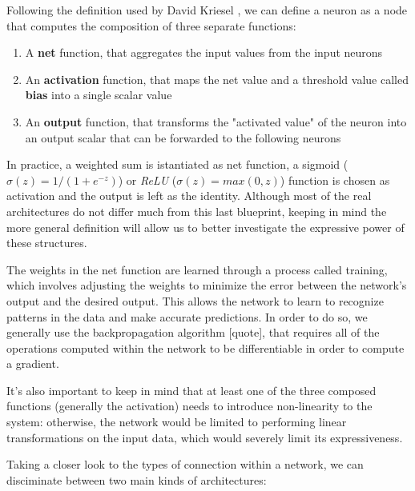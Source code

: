\documentclass{article}
\begin{document}
Following the definition used by David Kriesel \cite{KRI07}, we can define a neuron as a node that computes the composition of three separate functions:

\begin{enumerate}
    \item A \textbf{net} function, that aggregates the input values from the input neurons
    \item An \textbf{activation} function, that maps the net value and a threshold value called \textbf{bias} into a single scalar value
    \item An \textbf{output} function, that transforms the "activated value" of the neuron into an output scalar that can be forwarded to the following neurons
\end{enumerate}

In practice, a weighted sum is istantiated as net function, a sigmoid ($\sigma(z)=1/(1+e^{-z})$) or \textit{ReLU} ($\sigma(z) = max(0,z)$) function is chosen as activation and the output is left as the identity. Although most of the real architectures do not differ much from this last blueprint, keeping in mind the more general definition will allow us to better investigate the expressive power of these structures.

The weights in the net function are learned through a process called training, which involves adjusting the weights to minimize the error between the network's output and the desired output. This allows the network to learn to recognize patterns in the data and make accurate predictions. In order to do so, we generally use the backpropagation algorithm [quote], that requires all of the operations computed within the network to be differentiable in order to compute a gradient.

It's also important to keep in mind that at least one of the three composed functions (generally the activation) needs to introduce non-linearity to the system: otherwise, the network would be limited to performing linear transformations on the input data, which would severely limit its expressiveness.

Taking a closer look to the types of connection within a network, we can disciminate between two main kinds of architectures:
\end{document}
